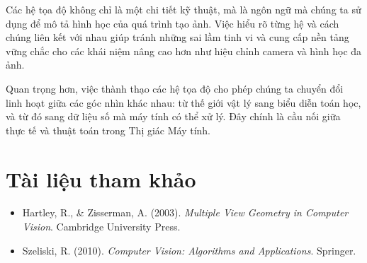 Các hệ tọa độ không chỉ là một chi tiết kỹ thuật, mà là ngôn ngữ mà chúng ta sử dụng để mô tả hình học của quá trình tạo ảnh. Việc hiểu rõ từng hệ và cách chúng liên kết với nhau giúp tránh những sai lầm tinh vi và cung cấp nền tảng vững chắc cho các khái niệm nâng cao hơn như hiệu chỉnh camera và hình học đa ảnh.

Quan trọng hơn, việc thành thạo các hệ tọa độ cho phép chúng ta chuyển đổi linh hoạt giữa các góc nhìn khác nhau: từ thế giới vật lý sang biểu diễn toán học, và từ đó sang dữ liệu số mà máy tính có thể xử lý. Đây chính là cầu nối giữa thực tế và thuật toán trong Thị giác Máy tính.

\section*{Tài liệu tham khảo}
\begin{itemize}
	\item[1] Hartley, R., \& Zisserman, A. (2003). \textit{Multiple View Geometry in Computer Vision}. Cambridge University Press.
	\item[2] Szeliski, R. (2010). \textit{Computer Vision: Algorithms and Applications}. Springer.
\end{itemize}